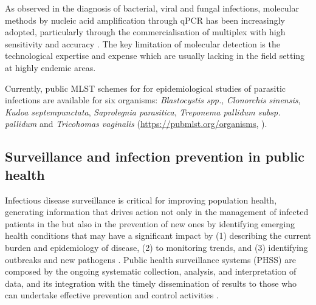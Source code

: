 As observed in the diagnosis of bacterial, viral and fungal infections, molecular methods by nucleic acid amplification through qPCR has been increasingly adopted, particularly through the commercialisation of multiplex with high sensitivity and accuracy \citep{momcilovic_rapid_2019, wong_molecular_2014}. The key limitation of molecular detection is the technological expertise and expense which are usually lacking in the field setting at highly endemic areas.

Currently, public MLST schemes for for epidemiological studies of parasitic infections are available for six organisms: \textit{Blastocystis spp.},\textit{ Clonorchis sinensis}, \textit{Kudoa septempunctata}, \textit{Saprolegnia parasitica}, \textit{Treponema pallidum subsp. pallidum} and \textit{Tricohomas vaginalis} (\url{https://pubmlst.org/organisms}, \cite{jolley_open-access_2018}).

\subsection{Surveillance and infection prevention in public health}

Infectious disease surveillance is critical for improving population health, generating information that drives action not only in the management of infected patients in the but also in the prevention of new ones by identifying emerging health conditions that may have a significant impact by (1) describing the current burden and epidemiology of disease, (2) to monitoring trends, and (3) identifying outbreaks and new pathogens \citep{groseclose_public_2017, murray_infectious_2017}. Public health surveillance systems (PHSS) are composed by the ongoing systematic collection, analysis, and interpretation of data, and its integration with the timely dissemination of results to those who can undertake effective prevention and control activities \citep{teutsch_considerations_2010}. 

